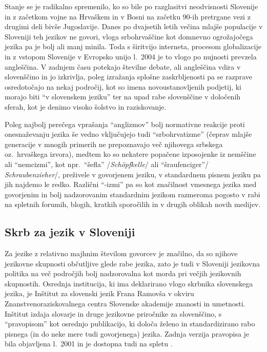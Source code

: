 \begin{multicols}{2}
Stanje se je radikalno spremenilo, ko so bile po razglasitvi neodvisnosti Slovenije in z začetkom vojne na Hrvaškem in v Bosni na začetku 90-ih pretrgane vezi z drugimi deli bivše Jugoslavije. Danes po dvajsetih letih večina mlajše populacije v Sloveniji teh jezikov ne go\-vori, vloga srbohrvaščine kot domnevno ogrožajočega jezika pa je bolj ali manj minila. Toda s širitvijo interneta, procesom globalizacije in z vstopom Slovenije v Evropsko unijo l.~2004 je to vlogo po nujnosti prevzela angleščina. V zadnjem času potekajo številne debate, ali angleščina vdira v slovenščino in jo izkrivlja, poleg izražanja splošne zaskrb\-ljenosti pa se razprave osredotočajo na nekaj področij, kot so imena novoustanov\-ljenih podjetij, ki morajo biti “v slovenskem jeziku” ter na upad rabe slovenščine v določenih sferah, kot je denimo visoko šolstvo in raziskovanje.

Poleg naj\-bolj perečega vprašanja “anglizmov” bolj normativne reakcije proti onesnaževanju jezika še vedno vključujejo tudi “srbohrvatizme” (čeprav mlajše generacije v mnogih primerih ne prepoznavajo več njihovega srbskega oz.~hrvaškega izvora), medtem ko so nekatere popačene izposojenke iz nemščine ali “nemcizmi”, kot npr.~“šefla” /\textit{Schöpfkelle}/ ali ``šraufenciger''/ \textit{Schraubenzieher}/, preživele v go\-vorjenem jeziku, v standardnem pisnem jeziku pa jih naj\-demo le redko. Raz\-lični “-izmi” pa so kot značilnost vmesnega jezika med go\-vorjenim in bolj nadzorovanim standardnim jezikom razmeroma pogosto v rabi na spletnih forumih, blogih, kratkih sporočilih in v drugih oblikah novih medijev.

\subsection{Skrb za jezik v Sloveniji}

Za jezike z relativno majhnim številom go\-vorcev je značilno, da so njihove jezikovne skupnosti občutljive glede rabe jezika, zato je tudi v Sloveniji jezikovna politika na več področjih bolj nadzorovalna kot morda pri večjih jezikovnih skupnostih. Osrednja institucija, ki ima deklarirano vlogo skrbnika slovenskega jezika, je Inštitut za slovenski jezik Frana Ramovša v okviru Znanstvenoraziskovalnega centra Slovenske akademije znanosti in umetnosti. Inštitut izdaja slovarje in druge jezikovne priročnike za slovenščino, s “pravopisom” kot osrednjo publikacijo, ki določa želeno in standardizirano rabo pisnega (in do neke mere tudi go\-vorjenega) jezika. Zadnja verzija pravopisa je bila objav\-ljena l.~2001 in je dostopna tudi na spletu \cite{ISJFR1}.


\end{multicols}
